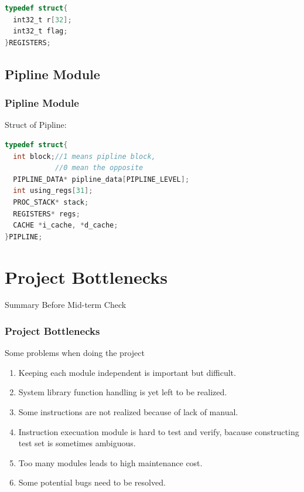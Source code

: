 \documentclass[CJK]{beamer}
\begin{document}
\begin{CJK}{UTF8}{gbsn}
\begin{frame}[fragile]
\begin{lstlisting}[language={C}]
typedef struct{
  int32_t r[32];
  int32_t flag;
}REGISTERS;
\end{lstlisting}
\end{frame}

\subsection{Pipline Module}
\begin{frame}[fragile]
  \frametitle{Pipline Module}
  Struct of Pipline:
\begin{lstlisting}[language={C}]
typedef struct{
  int block;//1 means pipline block,
            //0 mean the opposite
  PIPLINE_DATA* pipline_data[PIPLINE_LEVEL];
  int using_regs[31];
  PROC_STACK* stack;
  REGISTERS* regs;
  CACHE *i_cache, *d_cache;
}PIPLINE;
\end{lstlisting}
\end{frame}


\section{Project Bottlenecks}

\begin{frame}
  \huge{Summary Before Mid-term Check}
\end{frame}

\begin{frame}
  \frametitle{Project Bottlenecks}
  Some problems when doing the project
  \begin{enumerate}
    \item Keeping each module independent is important but difficult.
    \item System library function handling is yet left to be realized.
    \item Some instructions are not realized because of lack of manual.
    \item Instruction execuation module is hard to test and verify, bacause constructing test set is sometimes ambiguous.
    \item Too many modules leads to high maintenance cost.
    \item Some potential bugs need to be resolved.
  \end{enumerate}
\end{frame}


\end{CJK}
\end{document}
